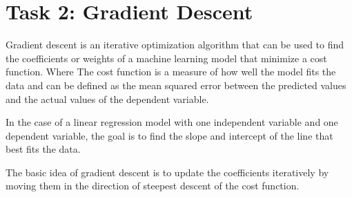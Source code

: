 \documentclass{article}
\begin{document}
\section{Task 2: Gradient Descent}

Gradient descent is an iterative optimization algorithm that can be used to find the coefficients or weights of a machine learning model that minimize a cost function. Where The cost function is a measure of how well the model fits the data and can be defined as the mean squared error between the predicted values and the actual values of the dependent variable.

In the case of a linear regression model with one independent variable and one dependent variable, the goal is to find the slope and intercept of the line that best fits the data.

The basic idea of gradient descent is to update the coefficients iteratively by moving them in the direction of steepest descent of the cost function.
\end{document}
